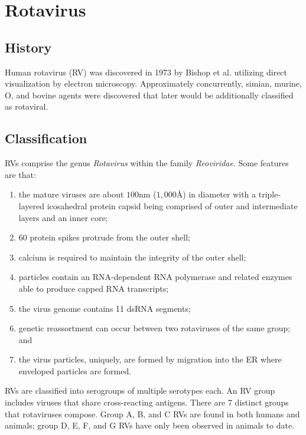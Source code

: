 
\chapter{Rotavirus}

\section{History}

Human rotavirus (RV) was discovered in 1973 by Bishop et al. utilizing direct visualization by electron microscopy. Approximately concurrently, simian, murine, O, and bovine agents were discovered that later would be additionally classified as rotaviral.

\section{Classification}

RVs comprise the genus \textit{Rotavirus} within the family \textit{Reoviridae}. Some features are that:

\begin{enumerate}
	\item the mature viruses are about $100$nm ($1,000$\AA) in diameter with a triple-layered icosahedral protein capsid being comprised of outer and intermediate layers and an inner core;
	\item 60 protein spikes protrude from the outer shell;
	\item calcium is required to maintain the integrity of the outer shell;
	\item particles contain an RNA-dependent RNA polymerase and related enzymes able to produce capped RNA transcripts;
	\item the virus genome contains 11 dsRNA segments;
	\item genetic reassortment can occur between two rotaviruses of the same group; and
	\item the virus particles, uniquely, are formed by migration into the ER where enveloped particles are formed.
\end{enumerate}

RVs are classified into serogroups of multiple serotypes each. An RV group includes viruses that share cross-reacting antigens. There are 7 distinct groups that rotaviruses compose. Group A, B, and C RVs are found in both humans and animals; group D, E, F, and G RVs have only been observed in animals to date.

